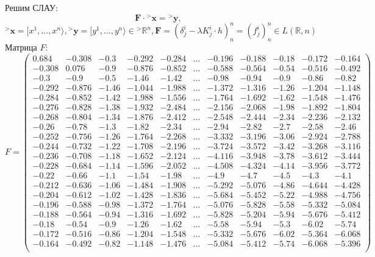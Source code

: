 \documentclass[12pt]{article}
\begin{document}
\indent Решим СЛАУ: $$\mathbf{F\cdot{}^>x={}^>y},$$ $${}^>\mathbf x=[x^1,...,x^n\rangle, {}^>\mathbf y=[y^1,...,y^n\rangle\in{}^>\mathbb{R}^n, \mathbf F=(\delta^i_j-\lambda K^i_j\cdot h)^n_n=(f^i_j)^n_n\in L(\mathbb R,n)$$
\indent Матрица $F$:
\begin{equation*}
    F = \left(
    \begin{array}{cccccccccccccccccccc}
0.684 & -0.308 & -0.3 & -0.292 & -0.284 & \ldots & -0.196 & -0.188 & -0.18 & -0.172 & -0.164 \\
-0.308 & 0.076 & -0.9 & -0.876 & -0.852 & \ldots & -0.588 & -0.564 & -0.54 & -0.516 & -0.492 \\
-0.3 & -0.9 & -0.5 & -1.46 & -1.42 & \ldots & -0.98 & -0.94 & -0.9 & -0.86 & -0.82 \\
-0.292 & -0.876 & -1.46 & -1.044 & -1.988 & \ldots & -1.372 & -1.316 & -1.26 & -1.204 & -1.148 \\
-0.284 & -0.852 & -1.42 & -1.988 & -1.556 & \ldots & -1.764 & -1.692 & -1.62 & -1.548 & -1.476 \\
-0.276 & -0.828 & -1.38 & -1.932 & -2.484 & \ldots & -2.156 & -2.068 & -1.98 & -1.892 & -1.804 \\
-0.268 & -0.804 & -1.34 & -1.876 & -2.412 & \ldots & -2.548 & -2.444 & -2.34 & -2.236 & -2.132 \\
-0.26 & -0.78 & -1.3 & -1.82 & -2.34 & \ldots & -2.94 & -2.82 & -2.7 & -2.58 & -2.46 \\
-0.252 & -0.756 & -1.26 & -1.764 & -2.268 & \ldots & -3.332 & -3.196 & -3.06 & -2.924 & -2.788 \\
-0.244 & -0.732 & -1.22 & -1.708 & -2.196 & \ldots & -3.724 & -3.572 & -3.42 & -3.268 & -3.116 \\
-0.236 & -0.708 & -1.18 & -1.652 & -2.124 & \ldots & -4.116 & -3.948 & -3.78 & -3.612 & -3.444 \\
-0.228 & -0.684 & -1.14 & -1.596 & -2.052 & \ldots & -4.508 & -4.324 & -4.14 & -3.956 & -3.772 \\
-0.22 & -0.66 & -1.1 & -1.54 & -1.98 & \ldots & -4.9 & -4.7 & -4.5 & -4.3 & -4.1 \\
-0.212 & -0.636 & -1.06 & -1.484 & -1.908 & \ldots & -5.292 & -5.076 & -4.86 & -4.644 & -4.428 \\
-0.204 & -0.612 & -1.02 & -1.428 & -1.836 & \ldots & -5.684 & -5.452 & -5.22 & -4.988 & -4.756 \\
-0.196 & -0.588 & -0.98 & -1.372 & -1.764 & \ldots & -5.076 & -5.828 & -5.58 & -5.332 & -5.084 \\
-0.188 & -0.564 & -0.94 & -1.316 & -1.692 & \ldots & -5.828 & -5.204 & -5.94 & -5.676 & -5.412 \\
-0.18 & -0.54 & -0.9 & -1.26 & -1.62 & \ldots & -5.58 & -5.94 & -5.3 & -6.02 & -5.74 \\
-0.172 & -0.516 & -0.86 & -1.204 & -1.548 & \ldots & -5.332 & -5.676 & -6.02 & -5.364 & -6.068 \\
-0.164 & -0.492 & -0.82 & -1.148 & -1.476 & \ldots & -5.084 & -5.412 & -5.74 & -6.068 & -5.396 \\

    \end{array}
    \right)
\end{equation*}
\end{document}
